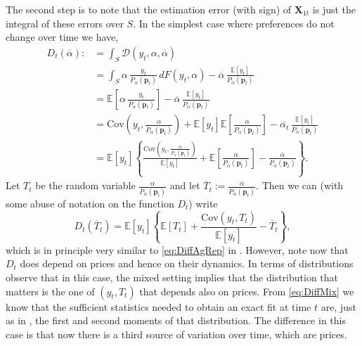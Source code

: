 \documentclass[english, a4paper,12pt]{article}
\begin{document}
The second step is to note that the estimation error (with sign) of $\mathbf{X}_{1t}$ is just the integral of these errors over $S$. In the simplest case where preferences do not change over time we have,
	\begin{align*}
		D_{t}(\overline{\alpha})
			:&=	\int_{S} \mathcal{D}(y_{t},\alpha,\overline{\alpha})	\\
			&=	\int_{S} \alpha\,\frac{y_{t}}{P_{\alpha}(\mathbf{p}_{t})} \, dF(y_{t},\alpha) - \overline{\alpha}\, \frac{\mathbb{E}[y_{t}]}{P_{\overline{\alpha}}(\mathbf{p}_{t})}	\\
			&=	\mathbb{E}\left[\alpha \, \frac{y_{t}}{P_{\alpha}(\mathbf{p}_{t})}\right] - \overline{\alpha}\, \frac{\mathbb{E}[y_{t}]}{P_{\overline{\alpha}}(\mathbf{p}_{t})}	\\
			&=	\mathrm{Cov}\left(y_{t}, \frac{\alpha}{P_{\alpha}(\mathbf{p}_{t})} \right) + \mathbb{E}[y_{t}]\mathbb{E}\left[\frac{\alpha}{P_{\alpha}(\mathbf{p}_{t})}\right] - \overline{\alpha_{t}}\, \frac{\mathbb{E}[y_{t}]}{P_{\overline{\alpha}}(\mathbf{p}_{t})}	\\
			&= 	\mathbb{E}[y_{t}]\left\{ \frac{\mathrm{Cov}\left(y_{t}, \frac{\alpha}{P_{\alpha}(\mathbf{p}_{t})} \right)}{\mathbb{E}[y_{t}]} + \mathbb{E}\left[\frac{\alpha}{P_{\alpha}(\mathbf{p}_{t})}\right] - \frac{\overline{\alpha}}{P_{\overline{\alpha}}(\mathbf{p}_{t})} \right\}.
	\end{align*}
Let $T_{t}$ be the random variable $\frac{\alpha}{P_{\alpha}(\mathbf{p}_{t})}$ and let $\overline{T}_{t} := \frac{\overline{\alpha}}{P_{\overline{\alpha}}(\mathbf{p}_{t})}$. Then we can (with some abuse of notation on the function $D_{t}$) write
	\begin{equation} \label{eq:DiffMix}
		D_{t}\left(\overline{T}_{t} \right) 
			= \mathbb{E}[y_{t}]\left\{ \mathbb{E}\left[T_{t} \right] + \frac{\mathrm{Cov}\left(y_{t}, T_{t} \right)}{\mathbb{E}[y_{t}]} - \overline{T}_{t} \right\},
	\end{equation}
which is in principle very similar to \eqref{eq:DiffAgRep} in . However, note now that $D_{t}$ does depend on prices and hence on their dynamics. In terms of distributions observe that in this case, the mixed setting implies that the distribution that matters is the one of $(y_{t},T_{t})$ that depends also on prices. From \eqref{eq:DiffMix} we know that the sufficient statistics needed to obtain an exact fit at time $t$ are, just as in , the first and second moments of that distribution. The difference in this case is that now there is a third source of variation over time, which are prices.
\end{document}
